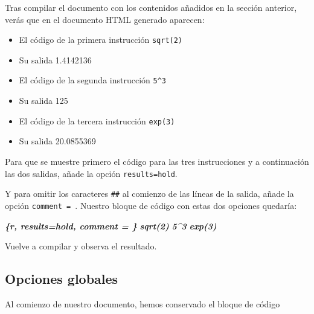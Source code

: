 \documentclass[
  title=normal,
  notoc,
  bib=normal]{mnye}
\newenvironment{Shaded}{\begin{snugshade}}{\end{snugshade}}
\newcommand{\InformationTok}[1]{\textcolor[rgb]{0.56,0.35,0.01}{\textbf{\textit{#1}}}}
\providecommand{\tightlist}{%
  \setlength{\itemsep}{0pt}\setlength{\parskip}{0pt}}
\begin{document}
Tras compilar el documento con los contenidos añadidos en la sección anterior, verás que en el documento HTML generado aparecen:

\begin{itemize}
\tightlist
\item
  El código de la primera instrucción \texttt{sqrt(2)}
\item
  Su salida 1.4142136
\item
  El código de la segunda instrucción \texttt{5\^{}3}
\item
  Su salida 125
\item
  El código de la tercera instrucción \texttt{exp(3)}
\item
  Su salida 20.0855369
\end{itemize}

Para que se muestre primero el código para las tres instrucciones y a continuación las dos salidas, añade la opción \texttt{results=\textquotesingle{}hold\textquotesingle{}}.

Y para omitir los caracteres \texttt{\#\#} al comienzo de las líneas de la salida, añade la opción \texttt{comment\ =\ \textquotesingle{}\textquotesingle{}}. Nuestro bloque de código con estas dos opciones quedaría:

\begin{Shaded}
\begin{Highlighting}[]
\InformationTok{\textasciigrave{}\textasciigrave{}\textasciigrave{}\{r, results=\textquotesingle{}hold\textquotesingle{}, comment = \textquotesingle{}\textquotesingle{}\}}
\InformationTok{sqrt(2)}
\InformationTok{5\^{}3}
\InformationTok{exp(3)}
\InformationTok{\textasciigrave{}\textasciigrave{}\textasciigrave{}}
\end{Highlighting}
\end{Shaded}

Vuelve a compilar y observa el resultado.

\hypertarget{global-options}{%
\subsection{Opciones globales}\label{global-options}}

Al comienzo de nuestro documento, hemos conservado el bloque de código

\begin{Shaded}
\end{Shaded}
\end{document}
